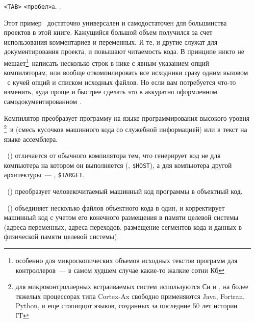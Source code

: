 
\bigskip


 \verb|<TAB>|
 \verb|<пробел>|а.
.

\bigskip
Этот пример \makefile\ достаточно универсален и самодостаточен для большинства
проектов в этой книге. Кажущийся большой объем получился за счет использования
комментариев и переменных. И те, и другие служат для документирования проекта,
и повышают читаемость кода. В принципе никто не мешает\footnote{особенно для
микроскопических объемов исходных текстов программ для контроллеров\ ---
в самом худшем случае какие-то жалкие сотни Кб}\ написать несколько строк в
нике с явным указанием опций компиляторам, или вообще откомпилировать
все исходники сразу одним вызовом \ с кучей опций и списком исходных
файлов. Но если вам потребуется что-то изменить, куда проще и быстрее сделать
это в аккуратно оформленном самодокументированном \makefile.

\bigskip
  Компилятор преобразует программу на языке программирования высокого уровня
  \footnote{для микроконтроллерных встраиваемых систем используются Си и \cpp,
  на более тяжелых процессорах типа Cortex-Ax свободно применяются Java,
  Fortran, Python, и еще стопиццот языков, созданных за последние 50 лет истории
  IT}\ в  (смесь кусочков машинного кода со служебной
  информацией) или в текст на языке ассемблера.
  
  \ () отличается от обычного
  компилятора тем, что генерирует код не для компьютера на котором он
  выполняется (, \verb|$HOST|), а для компьютера другой
  архитектуры\ --- , \verb|$TARGET|.
  
  \ () преобразует человекочитаемый машинный код
  программы в объектный код.
  
  \ () объединяет несколько файлов объектного кода в один,
  и корректирует машинный код с учетом его конечного размещения в памяти целевой
  системы (адреса переменных, адреса переходов, размещение сегментов кода и
  данных в физической памяти целевой системы).
  
